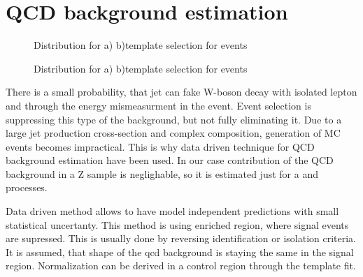 \section{QCD background estimation}


\begin{figure}[!tbp]
\begin{minipage}[h]{0.49\linewidth}
\end{minipage}
\hfill
\begin{minipage}[h]{0.49\linewidth}
\end{minipage}
\caption{Distribution for a) \etmiss b)\mtw template selection  for \wenu events}
\label{ris:TemplateE}

\vfill

\begin{minipage}[h]{0.49\linewidth}
\end{minipage}
\hfill
\begin{minipage}[h]{0.49\linewidth}
\end{minipage}
\caption{Distribution for a) \etmiss b)\mtw template selection  for \wmunu events}
\label{ris:TemplateMu}
\end{figure}

There is a small probability, that jet can fake W-boson decay with isolated lepton and \etmiss through the energy mismeasurment in the event.  Event selection is suppressing this type of the background, but not fully eliminating it. Due to a large jet production cross-section and complex composition, generation of MC events becomes impractical. This is why data driven technique for QCD background estimation have been used. In our case contribution of the QCD background  in a Z sample is neglighable, so it is estimated just for a \wenu and \wmunu processes. 

Data driven method allows to have model independent predictions with small statistical uncertanty. This method is using \qcd enriched region, where signal events are supressed. This is usually done by reversing identification or isolation criteria. It is assumed, that shape of the qcd background is staying the same in the signal region. Normalization can  be derived in a control region through the template fit. 

